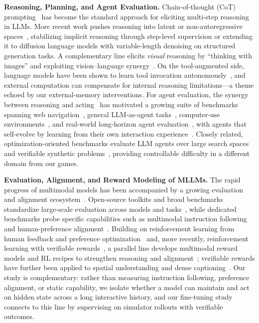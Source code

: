 \documentclass{llmxive}
\begin{document}
\noindent\textbf{Reasoning, Planning, and Agent Evaluation.}
Chain-of-thought (CoT) prompting~\citep{wei2022chain,kojima2022large} has become the standard approach for eliciting multi-step reasoning in LLMs. More recent work pushes reasoning into latent or non-autoregressive spaces~\citep{nye2021show,wxl_wei2026simcot,wxl_dai2026endocot,nie2025llada,li2025beyond}, stabilizing implicit reasoning through step-level supervision or extending it to diffusion language models with variable-length denoising on structured generation tasks. A complementary line elicits \emph{visual} reasoning by ``thinking with images'' and exploiting vision--language synergy~\citep{hu2024visualsketchpad,zhang2026etchr,zhang2025thinkvisually}. On the tool-augmented side, language models have been shown to learn tool invocation autonomously~\citep{schick2023toolformer,wxl_zhang2023toolmath}, and external computation can compensate for internal reasoning limitations---a theme echoed by our external-memory interventions. For agent evaluation, the synergy between reasoning and acting~\citep{yao2023react} has motivated a growing suite of benchmarks spanning web navigation~\citep{zhou2024webarena,deng2024mind2web}, general LLM-as-agent tasks~\citep{liu2023agentbench}, computer-use environments~\citep{xie2024osworld}, and real-world long-horizon agent evaluation~\citep{wxl_ding2026wildclawbench}, with agents that self-evolve by learning from their own interaction experience~\citep{sun2025seagent}. Closely related, optimization-oriented benchmarks evaluate LLM agents over large search spaces and verifiable synthetic problems~\citep{li2025optbench,li2025npengine}, providing controllable difficulty in a different domain from our games.

\noindent\textbf{Evaluation, Alignment, and Reward Modeling of MLLMs.}
The rapid progress of multimodal models has been accompanied by a growing evaluation and alignment ecosystem~\citep{zhang2025lmmsurvey}. Open-source toolkits and broad benchmarks standardize large-scale evaluation across models and tasks~\citep{duan2024vlmevalkit,yue2024mmmu}, while dedicated benchmarks probe specific capabilities such as multimodal instruction following~\citep{zhou2023ifeval,ding2025mmifengine} and human-preference alignment~\citep{zhao2025omnialignv}. Building on reinforcement learning from human feedback and preference optimization~\citep{ouyang2022instructgpt,rafailov2023dpo} and, more recently, reinforcement learning with verifiable rewards~\citep{deepseekai2025r1}, a parallel line develops multimodal reward models and RL recipes to strengthen reasoning and alignment~\citep{yu2024rlhfv,zang2025xcomposerreward,ding2026armthinker,liu2025spark,liu2026visualerm,zhao2026trustcritic,liu2025visualrft}; verifiable rewards have further been applied to spatial understanding and dense captioning~\citep{chen2024spatialvlm,yang2026caprl,liu2026spatialssrl}. Our study is complementary: rather than measuring instruction following, preference alignment, or static capability, we isolate whether a model can maintain and act on hidden state across a long interactive history, and our fine-tuning study connects to this line by supervising on simulator rollouts with verifiable outcomes.
\end{document}
